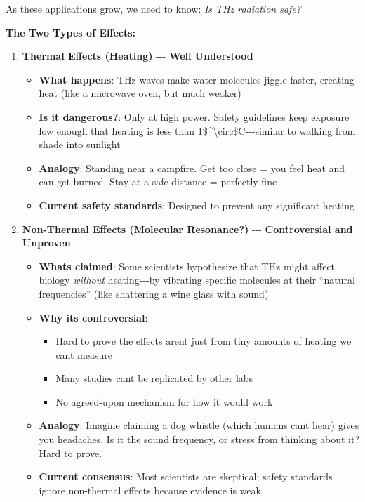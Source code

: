 As these applications grow, we need to know: \emph{Is THz radiation
safe?}

\textbf{The Two Types of Effects:}

\begin{enumerate}
\def\labelenumi{\arabic{enumi}.}
\tightlist
\item
  \textbf{Thermal Effects (Heating)} -\/-\/- \textbf{Well Understood}

  \begin{itemize}
  \tightlist
  \item
    \textbf{What happens}: THz waves make water molecules jiggle faster,
    creating heat (like a microwave oven, but much weaker)
  \item
    \textbf{Is it dangerous?}: Only at high power. Safety guidelines
    keep exposure low enough that heating is less than
    1\$\^{}\textbackslash circ\$C-\/-\/-similar to walking from shade
    into sunlight
  \item
    \textbf{Analogy}: Standing near a campfire. Get too close = you feel
    heat and can get burned. Stay at a safe distance = perfectly fine
  \item
    \textbf{Current safety standards}: Designed to prevent any
    significant heating
  \end{itemize}
\item
  \textbf{Non-Thermal Effects (Molecular Resonance?)} -\/-\/-
  \textbf{Controversial and Unproven}

  \begin{itemize}
  \tightlist
  \item
    \textbf{What\textquotesingle s claimed}: Some scientists hypothesize
    that THz might affect biology \emph{without} heating-\/-\/-by
    vibrating specific molecules at their ``natural frequencies'' (like
    shattering a wine glass with sound)
  \item
    \textbf{Why it\textquotesingle s controversial}:

    \begin{itemize}
    \tightlist
    \item
      Hard to prove the effects aren\textquotesingle t just from tiny
      amounts of heating we can\textquotesingle t measure
    \item
      Many studies can\textquotesingle t be replicated by other labs
    \item
      No agreed-upon mechanism for how it would work
    \end{itemize}
  \item
    \textbf{Analogy}: Imagine claiming a dog whistle (which humans
    can\textquotesingle t hear) gives you headaches. Is it the sound
    frequency, or stress from thinking about it? Hard to prove.
  \item
    \textbf{Current consensus}: Most scientists are skeptical; safety
    standards ignore non-thermal effects because evidence is weak
  \end{itemize}
\end{enumerate}

